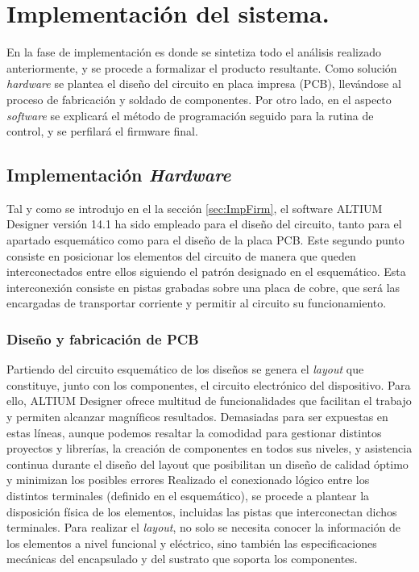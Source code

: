 \chapter{Implementación del sistema.}
\label{cap: capitulo_5}


En la fase de implementación es donde se sintetiza todo el análisis realizado anteriormente,
y se procede a formalizar el producto resultante. Como solución \textit{hardware} se plantea el
diseño del circuito en placa impresa (\acrshort{PCB}), llevándose al proceso de
fabricación y soldado de componentes. Por otro lado, en el aspecto \textit{software} se explicará el
método de programación seguido para la rutina de control, y se perfilará el firmware final.

\section{Implementación \textit{Hardware}}
\label{sec:ImpHard}
Tal y como se introdujo en el la sección \ref{sec:ImpFirm}, el software ALTIUM Designer
versión 14.1 ha sido empleado para el diseño del circuito, tanto para el apartado esquemático
como para el diseño de la placa PCB. Este segundo punto consiste en posicionar los elementos
del circuito de manera que queden interconectados entre ellos siguiendo el patrón designado
en el esquemático. Esta interconexión consiste en pistas grabadas sobre una placa de cobre,
que será las encargadas de transportar corriente y permitir al circuito su funcionamiento.

\subsection{Diseño y fabricación de \acrshort{PCB}}
\label{sec:Diseño}

Partiendo del circuito esquemático de los diseños se genera el \textit{layout} que constituye, junto
con los componentes, el circuito electrónico del dispositivo. Para ello, ALTIUM Designer
ofrece multitud de funcionalidades que facilitan el trabajo y permiten alcanzar magníficos
resultados. Demasiadas para ser expuestas en estas líneas, aunque podemos resaltar la comodidad
para gestionar distintos proyectos y librerías, la creación de componentes en todos
sus niveles, y asistencia continua durante el diseño del layout que posibilitan un diseño de
calidad óptimo y minimizan los posibles errores
Realizado el conexionado lógico entre los distintos terminales (definido en el esquemático),
se procede a plantear la disposición física de los elementos, incluidas las pistas que interconectan
dichos terminales. Para realizar el \textit{layout}, no solo se necesita conocer la información
de los elementos a nivel funcional y eléctrico, sino también las especificaciones mecánicas del
encapsulado y del sustrato que soporta los componentes.

